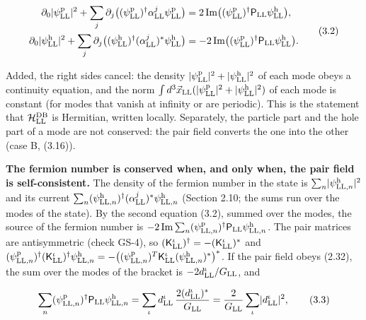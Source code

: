 \documentclass[
  10pt,
]{article}
\begin{document}
\[\begin{aligned}\partial_0\lvert\psi^{\rm p}_{\rm LL}\rvert^2+\sum_j\partial_j\big((\psi^{\rm p}_{\rm LL})^\dagger\alpha^j_{\rm LL}\psi^{\rm p}_{\rm LL}\big)&=2\,\mathrm{Im}\big((\psi^{\rm p}_{\rm LL})^\dagger\mathsf P_{\rm LL}\psi^{\rm h}_{\rm LL}\big),\\\partial_0\lvert\psi^{\rm h}_{\rm LL}\rvert^2+\sum_j\partial_j\big((\psi^{\rm h}_{\rm LL})^\dagger(\alpha^j_{\rm LL})^*\psi^{\rm h}_{\rm LL}\big)&=-2\,\mathrm{Im}\big((\psi^{\rm p}_{\rm LL})^\dagger\mathsf P_{\rm LL}\psi^{\rm h}_{\rm LL}\big).\end{aligned}\tag{3.2}\]

Added, the right sides cancel: the density
\(\lvert\psi^{\rm p}_{\rm LL}\rvert^2+\lvert\psi^{\rm h}_{\rm LL}\rvert^2\)
of each mode obeys a continuity equation, and the norm
\(\int d^3\vec x_{\rm LL}(\lvert\psi^{\rm p}_{\rm LL}\rvert^2+\lvert\psi^{\rm h}_{\rm LL}\rvert^2)\)
of each mode is constant (for modes that vanish at infinity or are
periodic). This is the statement that \(\mathcal H^{\rm DB}_{\rm LL}\)
is Hermitian, written locally. Separately, the particle part and the
hole part of a mode are not conserved: the pair field converts the one
into the other (case B, (3.16)).

\textbf{The fermion number is conserved when, and only when, the pair
field is self-consistent.} The density of the fermion number in the
state is \(\sum_n\lvert\psi^{\rm h}_{{\rm LL},n}\rvert^2\) and its
current
\(\sum_n(\psi^{\rm h}_{{\rm LL},n})^\dagger(\alpha^j_{\rm LL})^*\psi^{\rm h}_{{\rm LL},n}\)
(Section 2.10; the sums run over the modes of the state). By the second
equation (3.2), summed over the modes, the source of the fermion number
is
\(-2\,\mathrm{Im}\sum_n(\psi^{\rm p}_{{\rm LL},n})^\dagger\mathsf P_{\rm LL}\psi^{\rm h}_{{\rm LL},n}\).
The pair matrices are antisymmetric (check GS-4), so
\((\mathsf K^\iota_{\rm LL})^\dagger=-(\mathsf K^\iota_{\rm LL})^*\) and
\((\psi^{\rm p}_{{\rm LL},n})^\dagger(\mathsf K^\iota_{\rm LL})^\dagger\psi^{\rm h}_{{\rm LL},n}=-\big((\psi^{\rm p}_{{\rm LL},n})^T\mathsf K^\iota_{\rm LL}(\psi^{\rm h}_{{\rm LL},n})^*\big)^*\).
If the pair field obeys (2.32), the sum over the modes of the bracket is
\(-2d^\iota_{\rm LL}/G_{\rm LL}\), and

\[\sum_n(\psi^{\rm p}_{{\rm LL},n})^\dagger\mathsf P_{\rm LL}\psi^{\rm h}_{{\rm LL},n}=\sum_\iota d^\iota_{\rm LL}\,\frac{2(d^\iota_{\rm LL})^*}{G_{\rm LL}}=\frac2{G_{\rm LL}}\sum_\iota\lvert d^\iota_{\rm LL}\rvert^2,\tag{3.3}\]
\end{document}
